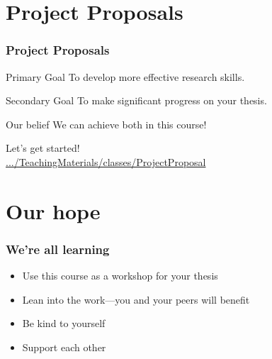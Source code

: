 \documentclass{beamer}
\begin{document}
\section{Project Proposals}


\begin{frame}
    \frametitle{Project Proposals}

    \begin{block}{Primary Goal}
        To develop more effective research skills.
    \end{block}

    \begin{block}{Secondary Goal}
        To make significant progress on your thesis.
    \end{block}

    \begin{block}{Our belief}
        We can achieve both in this course!
    \end{block}

Let's get started!\\
        \href{https://github.com/analyticalworkflows/TeachingMaterials/tree/master/classes/ProjectProposal}{.../TeachingMaterials/classes/ProjectProposal}


\end{frame}


\section{Our hope}

\begin{frame}
    \frametitle{We're all learning}

    \begin{itemize}
        \item Use this course as a workshop for your thesis
        \item Lean into the work---you and your peers will benefit
        \item Be kind to yourself
        \item Support each other
    \end{itemize}


\end{frame}
\end{document}
